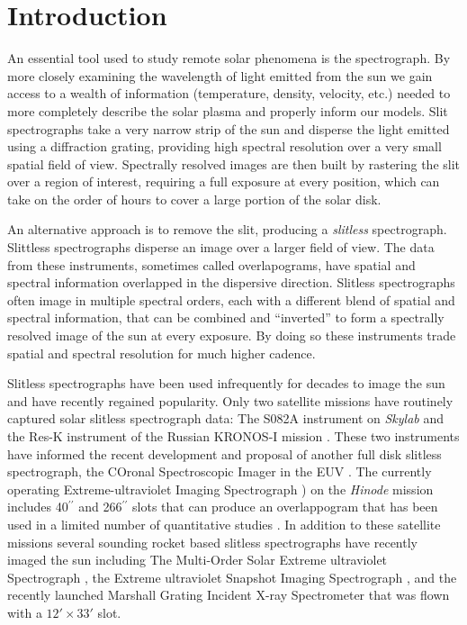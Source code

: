 
\section{Introduction}\label{sec:intro}
	
	An essential tool used to study remote solar phenomena is the spectrograph.
	By more closely examining the wavelength of light emitted from the sun we gain access to a wealth of information (temperature, density, velocity, etc.) needed to more completely describe the solar plasma and properly inform our models.
	Slit spectrographs take a very narrow strip of the sun and disperse the light emitted using a diffraction grating, providing high spectral resolution over a very small spatial field of view.
	Spectrally resolved images are then built by rastering the slit over a region of interest, requiring a full exposure at every position, which can take on the order of hours to cover a large portion of the solar disk.
	
	An alternative approach is to remove the slit, producing a \emph{slitless} spectrograph.
	Slittless spectrographs disperse an image over a larger field of view.
	The data from these instruments, sometimes called overlapograms, have spatial and spectral information overlapped in the dispersive direction.
	Slitless spectrographs often image in multiple spectral orders, each with a different blend of spatial and spectral information, that can be combined and ``inverted'' to form a spectrally resolved image of the sun at every exposure.
	By doing so these instruments trade spatial and spectral resolution for much higher cadence.
    
	Slitless spectrographs have been used infrequently for decades to image the sun and have recently regained popularity.
	Only two satellite missions have routinely captured solar slitless spectrograph data: The S082A instrument on {\it Skylab} \citep{Tousey1973} and the Res-K instrument of the Russian KRONOS-I mission \citep{Zhitnik1998}.
	These two instruments have informed the recent development and proposal of another 
	full disk slitless spectrograph, the COronal Spectroscopic Imager in the EUV  \citep[COSIE:][]{winebarger2019,golub2020}.
	The currently operating Extreme-ultraviolet Imaging Spectrograph \citep[EIS:][]{culhane2007}) on the {\it Hinode} mission \citep{kosugi2007} includes 40$^{\prime\prime}$ and 266$^{\prime\prime}$ slots that can produce an overlappogram that has been used in a limited number of quantitative studies \citep{harra2017,harra2020}.
	In addition to these satellite missions several sounding rocket based slitless spectrographs have recently imaged the sun including The Multi-Order Solar Extreme ultraviolet Spectrograph \citep[MOSES:][]{Fox2011}, the Extreme ultraviolet Snapshot Imaging Spectrograph \citep[ESIS:][]{ESIS,Parker2021}, and the recently launched Marshall Grating Incident X-ray Spectrometer \citep[MaGIXS:][]{MaGIXS} that was flown with a $12' \times 33'$ slot.
	
